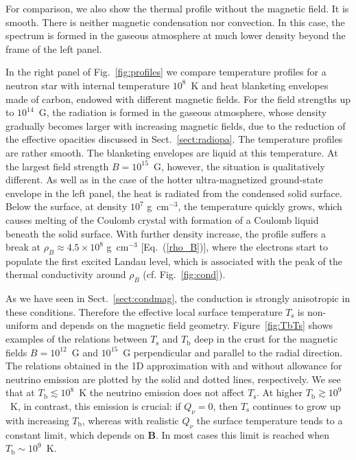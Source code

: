 \documentclass[smallextended]{svjour3}       %
\newcommand{\gcc}{\mbox{g~cm$^{-3}$}}
\newcommand{\req}[1]{Eq.~(\ref{#1})}
\newcommand{\Ts}{T_\mathrm{s}}
\begin{document}
For comparison, we also show the thermal profile without the
magnetic field. It is smooth. There is
neither magnetic condensation nor convection. In this case,
the spectrum is formed in the gaseous atmosphere at much
lower density beyond the
frame of the left panel. 

In the right panel of Fig.~\ref{fig:profiles} we compare
temperature profiles for a neutron star with internal
temperature $10^8$~K and heat blanketing envelopes made of
carbon, endowed with different magnetic fields. For the
field strengths up to $10^{14}$~G, the radiation is formed
in the gaseous atmosphere, whose density gradually becomes
larger with increasing magnetic fields, due to the reduction
of the effective opacities discussed in
Sect.~\ref{sect:radiopa}. The temperature profiles are
rather smooth. The blanketing envelopes are liquid at this
temperature. At the largest field strength $B=10^{15}$~G,
however, the situation is qualitatively different. As well
as in the case of the hotter ultra-magnetized ground-state
envelope in the left panel, the heat is radiated from the
condensed solid surface. Below the surface, at density
$10^7$ \gcc, the temperature quickly grows, which
causes melting of the Coulomb crystal with formation of a
Coulomb liquid beneath the solid surface. With further
density increase, the profile suffers a break at
$\rho_B\approx4.5\times10^8$ \gcc{} [\req{rho_B}], where the
electrons start to populate the first excited Landau level,
which is associated with the peak of the thermal
conductivity around $\rho_B$ (cf.{} Fig.~\ref{fig:cond}).

As we have seen in Sect.~\ref{sect:condmag}, the conduction
is strongly anisotropic in these conditions.
Therefore the effective local surface temperature $\Ts$ is
non-uniform and depends on the magnetic field geometry.
Figure~\ref{fig:TbTs} shows examples of the relations
between $\Ts$ and $T_\mathrm{b}$ deep in the crust for the
magnetic fields $B=10^{12}$~G and $10^{15}$~G perpendicular
and parallel to the radial direction.  The relations
obtained in the 1D approximation \citep{PCY07} with and
without allowance for neutrino emission are plotted by the
solid and dotted lines, respectively. We see that at
$T_\mathrm{b}\lesssim10^8$~K the neutrino emission does not
affect $\Ts$. At higher $T_\mathrm{b}\gtrsim10^9$~K, in
contrast, this emission is crucial: if $Q_\nu=0$, then $\Ts$
continues to grow up with increasing $T_\mathrm{b}$, whereas
with realistic $Q_\nu$ the surface temperature tends to  a
constant limit, which depends on $\bm{B}$. In most cases
this limit is reached when $T_\mathrm{b}\sim10^9$~K.
\end{document}
